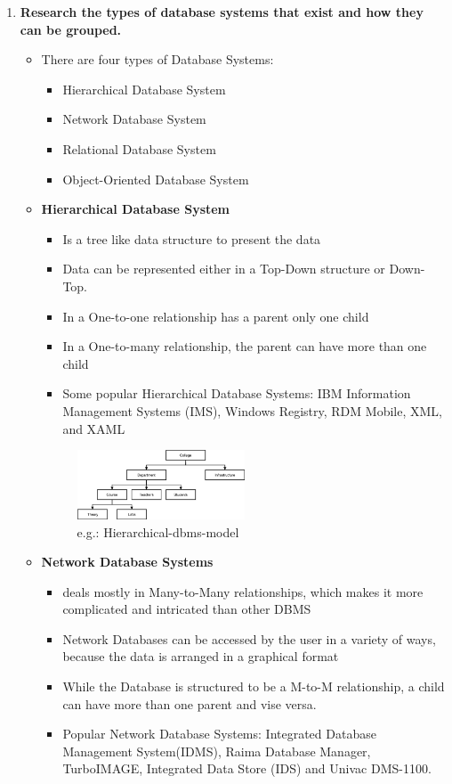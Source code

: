 \documentclass{article}
\begin{document}
\begin{enumerate}
\item \textbf{Research the types of database systems that exist and how they can be grouped.}
\begin{itemize}
	\item There are four types of Database Systems: \cite{database_systems}
	\begin{itemize}
		\item Hierarchical Database System
		\item Network Database System
		\item Relational Database System
		\item Object-Oriented Database System
	\end{itemize}
	
	\item \textbf{Hierarchical Database System}\cite{database_systems}

	\begin{itemize}
		\item Is a tree like data structure to present the data
		\item Data can be represented either in a Top-Down structure or Down-Top. 
		\item In a One-to-one relationship has a parent only one child
		\item In a One-to-many relationship, the parent can have more than one child
		\item Some popular Hierarchical Database Systems: IBM Information Management Systems (IMS), Windows Registry, RDM Mobile, XML, and XAML
	\end{itemize}

	\begin{figure}[h]
	\centering
	\includegraphics[width=0.5\textwidth]{hierarchical-dbms-model}
	\caption{e.g.: Hierarchical-dbms-model}
	\end{figure}


		\item \textbf{Network Database Systems}
	\begin{itemize}
		\item deals mostly in Many-to-Many relationships, which makes it more complicated and intricated than other DBMS
		\item Network Databases can be accessed by the user in a variety of ways, because the data is arranged in a graphical format
		\item While the Database is structured to be a M-to-M relationship, a child can have more than one parent and vise versa. 
		\item Popular Network Database Systems: Integrated Database Management System(IDMS), Raima Database Manager, TurboIMAGE, Integrated Data Store (IDS) and Univac DMS-1100.
	\end{itemize}
	

\end{itemize}
\end{enumerate}
\end{document}
